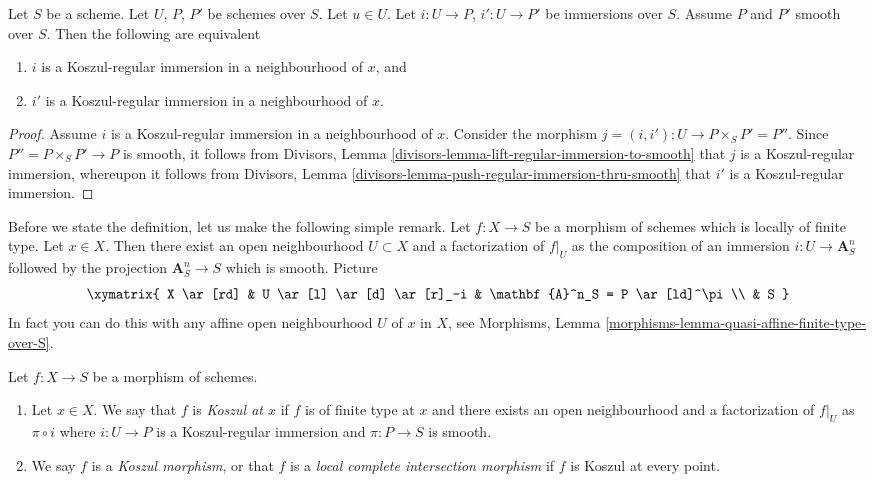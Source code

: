 \begin{lemma}
\label{lemma-koszul-independence-factorization}
Let $S$ be a scheme. Let $U$, $P$, $P'$ be schemes over $S$.
Let $u \in U$. Let $i : U \to P$, $i' : U \to P'$ be immersions over $S$.
Assume $P$ and $P'$ smooth over $S$. Then the following are equivalent
\begin{enumerate}
\item $i$ is a Koszul-regular immersion in a neighbourhood of $x$, and
\item $i'$ is a Koszul-regular immersion in a neighbourhood of $x$.
\end{enumerate}
\end{lemma}

\begin{proof}
Assume $i$ is a Koszul-regular immersion in a neighbourhood of $x$.
Consider the morphism $j = (i, i') : U \to P \times_S P' = P''$.
Since $P'' = P \times_S P' \to P$ is smooth, it follows from
Divisors, Lemma \ref{divisors-lemma-lift-regular-immersion-to-smooth}
that $j$ is a Koszul-regular immersion, whereupon it follows from
Divisors, Lemma \ref{divisors-lemma-push-regular-immersion-thru-smooth}
that $i'$ is a Koszul-regular immersion.
\end{proof}

\noindent
Before we state the definition, let us make the following simple
remark. Let $f : X \to S$ be a morphism of schemes which is locally
of finite type. Let $x \in X$. Then there exist an open neighbourhood
$U \subset X$ and a factorization of $f|_U$ as the composition of an
immersion $i : U \to \mathbf{A}^n_S$ followed by the projection
$\mathbf{A}^n_S \to S$ which is smooth. Picture
$$
\xymatrix{
X \ar[rd] & U \ar[l] \ar[d] \ar[r]_-i & \mathbf{A}^n_S = P \ar[ld]^\pi \\
& S
}
$$
In fact you can do this with any affine open neighbourhood
$U$ of $x$ in $X$, see
Morphisms, Lemma \ref{morphisms-lemma-quasi-affine-finite-type-over-S}.

\begin{definition}
\label{definition-lci}
Let $f : X \to S$ be a morphism of schemes.
\begin{enumerate}
\item Let $x \in X$. We say that $f$ is {\it Koszul at $x$} if $f$
is of finite type at $x$ and there exists an open neighbourhood
and a factorization of $f|_U$ as $\pi \circ i$ where $i : U \to P$
is a Koszul-regular immersion and $\pi : P \to S$ is smooth.
\item We say $f$ is a {\it Koszul morphism}, or that
$f$ is a {\it local complete intersection morphism}
if $f$ is Koszul at every point.
\end{enumerate}
\end{definition}

